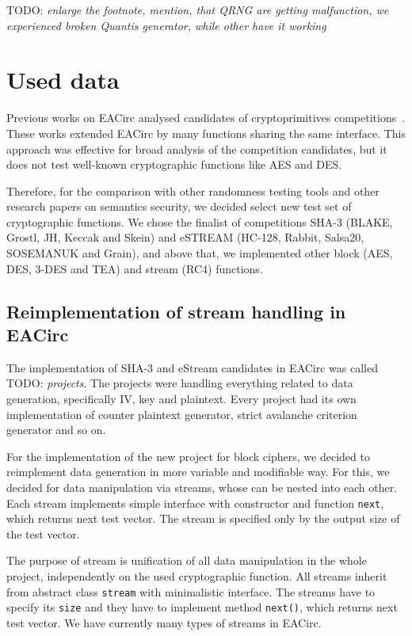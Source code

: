 \documentclass[
  print, %
  Table,   %
  nolof,     %
  nolot,     %
  11pt, %
  oneside  %
]{fithesis3}
\newcommand{\todo}[1]{TODO: \textit{#1}}
\begin{document}
\todo{enlarge the footnote, mention, that QRNG are getting malfunction, we experienced broken Quantis generator, while other have it working}

\section{Used data}
\label{sec:method-data}

Previous works on EACirc analysed candidates of cryptoprimitives competitions~\cite{estreamMgrThesis,sha3Thesis,ukropMgrThesis}. These works extended EACirc by many functions sharing the same interface. This approach was effective for broad analysis of the competition candidates, but it does not test well-known cryptographic functions like AES and DES.

Therefore, for the comparison with other randomness testing tools and other research papers on semantics security, we decided select new test set of cryptographic functions. We chose the finalist of competitions SHA-3 (BLAKE, Grostl, JH, Keccak and Skein) and eSTREAM (HC-128, Rabbit, Salsa20, SOSEMANUK and Grain), and above that, we implemented other block (AES, DES, 3-DES and TEA) and stream (RC4) functions.

\subsection{Reimplementation of stream handling in EACirc}
\label{subsec:method-data-streams}

The implementation of SHA-3 and eStream candidates in EACirc was called \todo{projects}. The projects were handling everything related to data generation, specifically IV, key and plaintext. Every project had its own implementation of counter plaintext generator, strict avalanche criterion generator and so on.

For the implementation of the new project for block ciphers, we decided to reimplement data generation in more variable and modifiable way. For this, we decided for data manipulation via streams, whose can be nested into each other. Each stream implements simple interface with constructor and function \texttt{next}, which returns next test vector. The stream is specified only by the output size of the test vector.

The purpose of stream is unification of all data manipulation in the whole project, independently on the used cryptographic function. All streams inherit from abstract class \texttt{stream} with minimalistic interface. The streams have to specify its \texttt{size} and they have to implement method \texttt{next()}, which returns next test vector. We have currently many types of streams in EACirc.
\end{document}
